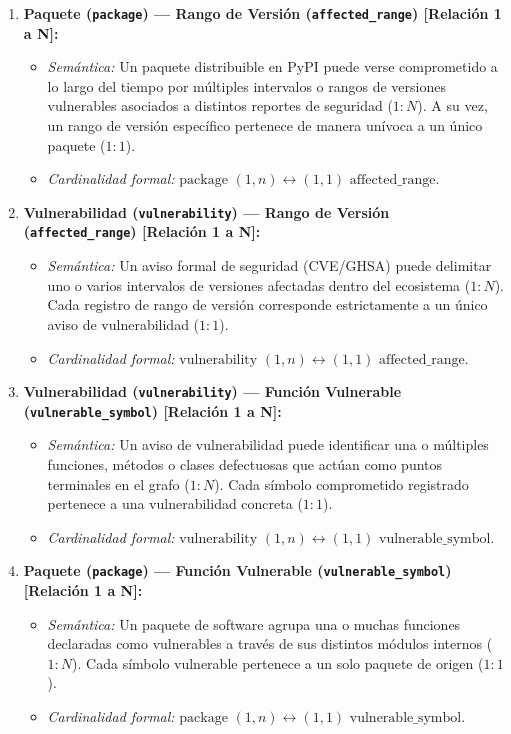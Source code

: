 \begin{enumerate}
    \item \textbf{Paquete (\texttt{package}) --- Rango de Versión (\texttt{affected\_\allowbreak range}) [Relación 1 a N]:}
    \begin{itemize}
        \item \textit{Semántica:} Un paquete distribuible en PyPI puede verse comprometido a lo largo del tiempo por múltiples intervalos o rangos de versiones vulnerables asociados a distintos reportes de seguridad ($1:N$). A su vez, un rango de versión específico pertenece de manera unívoca a un único paquete ($1:1$).
        \item \textit{Cardinalidad formal:} $\text{package } (1, n) \longleftrightarrow (1, 1) \text{ affected\_range}$.
    \end{itemize}

    \item \textbf{Vulnerabilidad (\texttt{vulnerability}) --- Rango de Versión (\texttt{affected\_\allowbreak range}) [Relación 1 a N]:}
    \begin{itemize}
        \item \textit{Semántica:} Un aviso formal de seguridad (CVE/GHSA) puede delimitar uno o varios intervalos de versiones afectadas dentro del ecosistema ($1:N$). Cada registro de rango de versión corresponde estrictamente a un único aviso de vulnerabilidad ($1:1$).
        \item \textit{Cardinalidad formal:} $\text{vulnerability } (1, n) \longleftrightarrow (1, 1) \text{ affected\_range}$.
    \end{itemize}

    \item \textbf{Vulnerabilidad (\texttt{vulnerability}) --- Función Vulnerable (\texttt{vulnerable\_\allowbreak symbol}) [Relación 1 a N]:}
    \begin{itemize}
        \item \textit{Semántica:} Un aviso de vulnerabilidad puede identificar una o múltiples funciones, métodos o clases defectuosas que actúan como puntos terminales en el grafo ($1:N$). Cada símbolo comprometido registrado pertenece a una vulnerabilidad concreta ($1:1$).
        \item \textit{Cardinalidad formal:} $\text{vulnerability } (1, n) \longleftrightarrow (1, 1) \text{ vulnerable\_symbol}$.
    \end{itemize}

    \item \textbf{Paquete (\texttt{package}) --- Función Vulnerable (\texttt{vulnerable\_\allowbreak symbol}) [Relación 1 a N]:}
    \begin{itemize}
        \item \textit{Semántica:} Un paquete de software agrupa una o muchas funciones declaradas como vulnerables a través de sus distintos módulos internos ($1:N$). Cada símbolo vulnerable pertenece a un solo paquete de origen ($1:1$).
        \item \textit{Cardinalidad formal:} $\text{package } (1, n) \longleftrightarrow (1, 1) \text{ vulnerable\_symbol}$.
    \end{itemize}


\end{enumerate}
